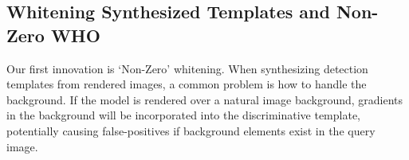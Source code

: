 


% 



\subsection{Whitening Synthesized Templates and Non-Zero WHO}
\label{sec:nzwho}
Our first innovation is `Non-Zero' whitening. When synthesizing detection
templates from rendered images, a common problem is how to handle the
background. If the model is rendered over a natural image background, gradients
in the background will be incorporated into the discriminative template,
potentially causing false-positives if background elements exist in the query
image.

